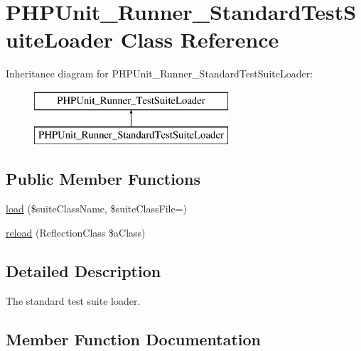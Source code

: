 \hypertarget{class_p_h_p_unit___runner___standard_test_suite_loader}{}\section{P\+H\+P\+Unit\+\_\+\+Runner\+\_\+\+Standard\+Test\+Suite\+Loader Class Reference}
\label{class_p_h_p_unit___runner___standard_test_suite_loader}
Inheritance diagram for P\+H\+P\+Unit\+\_\+\+Runner\+\_\+\+Standard\+Test\+Suite\+Loader\+:\begin{figure}[H]
\begin{center}
\leavevmode
\includegraphics[height=2.000000cm]{class_p_h_p_unit___runner___standard_test_suite_loader}
\end{center}
\end{figure}
\subsection*{Public Member Functions}
\begin{DoxyCompactItemize}
\item 
\mbox{\hyperlink{class_p_h_p_unit___runner___standard_test_suite_loader_a7d5039d0eb5672c1b69bbbb8c922c02b}{load}} (\$suite\+Class\+Name, \$suite\+Class\+File=\textquotesingle{}\textquotesingle{})
\item 
\mbox{\hyperlink{class_p_h_p_unit___runner___standard_test_suite_loader_af50f6853c6ef14bbd0162b490c45eb66}{reload}} (Reflection\+Class \$a\+Class)
\end{DoxyCompactItemize}


\subsection{Detailed Description}
The standard test suite loader. 

\subsection{Member Function Documentation}
\mbox{\label{class_p_h_p_unit___runner___standard_test_suite_loader_a7d5039d0eb5672c1b69bbbb8c922c02b}} 
